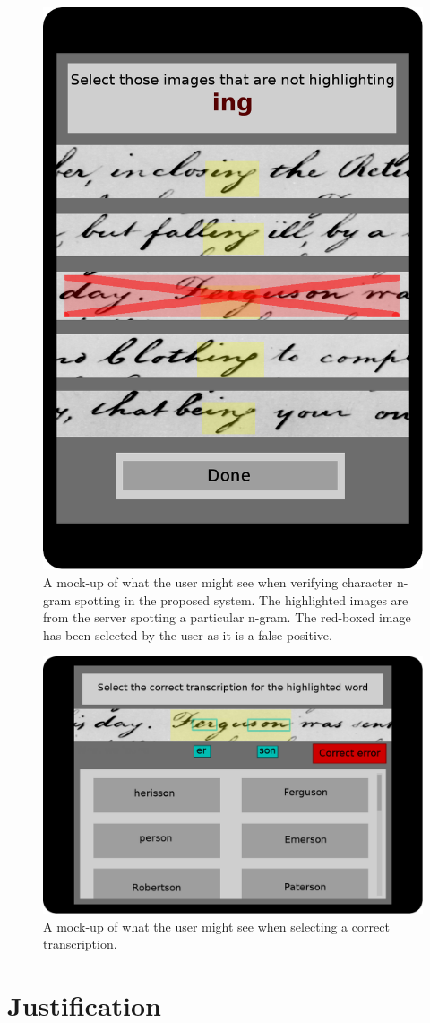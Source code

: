 \documentclass[conference]{IEEEtran}
\begin{document}
\begin{figure}
    \centering
    \includegraphics[width=.25\textwidth]{userTask_spot}
    \caption{A mock-up of what the user might see when verifying character n-gram spotting in the proposed system. The highlighted images are from the server spotting a particular n-gram. The red-boxed image has been selected by the user as it is a false-positive.}
    \label{fig:userTask_spot}
\end{figure}

\begin{figure}
    \centering
    \includegraphics[width=.35\textwidth]{userTask_trans}
    \caption{A mock-up of what the user might see when selecting a correct transcription.}
    \label{fig:userTask_trans}
\end{figure}

\section{Justification}

\end{document}
